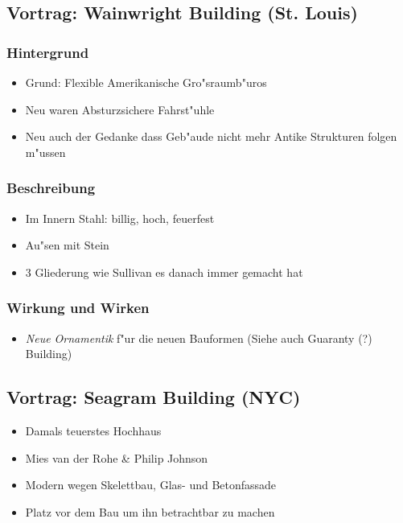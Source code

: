 \documentclass[emulatestandardclasses]{scrartcl}
\begin{document}
\subsection{Vortrag: Wainwright Building (St. Louis)}

\subsubsection{Hintergrund}

\begin{itemize}
  \item Grund: Flexible Amerikanische Gro"sraumb"uros
  \item Neu waren Absturzsichere Fahrst"uhle
  \item Neu auch der Gedanke dass Geb"aude nicht mehr Antike Strukturen folgen m"ussen
\end{itemize}


\subsubsection{Beschreibung}

\begin{itemize}
  \item Im Innern Stahl: billig, hoch, feuerfest
  \item Au"sen mit Stein 
  \item 3 Gliederung wie Sullivan es danach immer gemacht hat
\end{itemize}


\subsubsection{Wirkung und Wirken}

\begin{itemize}
  \item \emph{Neue Ornamentik} f"ur die neuen Bauformen (Siehe auch Guaranty (?) Building)
\end{itemize}

\subsection{Vortrag: Seagram Building (NYC)}


\begin{itemize}
  \item Damals teuerstes Hochhaus
  \item Mies van der Rohe \& Philip Johnson
  \item Modern wegen Skelettbau, Glas- und Betonfassade
  \item Platz vor dem Bau um ihn betrachtbar zu machen
\end{itemize}
\end{document}
